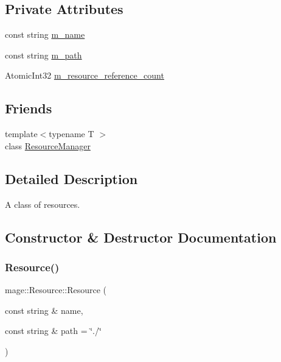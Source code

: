 \subsection*{Private Attributes}
\begin{DoxyCompactItemize}
\item 
const string \hyperlink{classmage_1_1_resource_a93019b74e9665195f1af17c60b6d171a}{m\+\_\+name}
\item 
const string \hyperlink{classmage_1_1_resource_a983470902250a8d16b6d5d01c332804b}{m\+\_\+path}
\item 
Atomic\+Int32 \hyperlink{classmage_1_1_resource_aa71f1ecac3436591032d2abd6a2f5c37}{m\+\_\+resource\+\_\+reference\+\_\+count}
\end{DoxyCompactItemize}
\subsection*{Friends}
\begin{DoxyCompactItemize}
\item 
{\footnotesize template$<$typename T $>$ }\\class \hyperlink{classmage_1_1_resource_a51a7bf7c13d389aeee09c16059ca41c9}{Resource\+Manager}
\end{DoxyCompactItemize}


\subsection{Detailed Description}
A class of resources. 

\subsection{Constructor \& Destructor Documentation}
\hypertarget{classmage_1_1_resource_a7b4febc86646d51ac116732af01abcaf}{}\label{classmage_1_1_resource_a7b4febc86646d51ac116732af01abcaf} 
\subsubsection{\texorpdfstring{Resource()}{Resource()}}
{\footnotesize\ttfamily mage\+::\+Resource\+::\+Resource (\begin{DoxyParamCaption}\item[{const string \&}]{name,  }\item[{const string \&}]{path = {\ttfamily \char`\"{}./\char`\"{}} }\end{DoxyParamCaption})}

